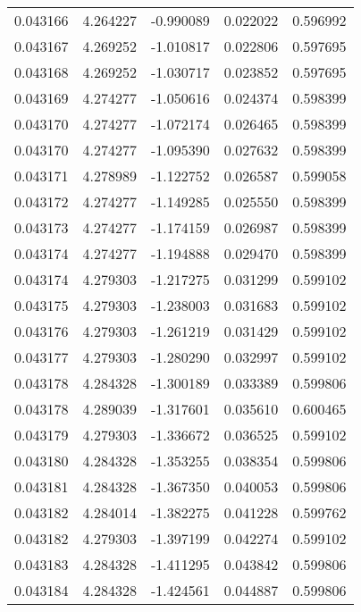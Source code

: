 \begin{tabular}{lrrrr}
0.043166    &  4.264227 & -0.990089 &  0.022022 &             0.596992 \\
0.043167    &  4.269252 & -1.010817 &  0.022806 &             0.597695 \\
0.043168    &  4.269252 & -1.030717 &  0.023852 &             0.597695 \\
0.043169    &  4.274277 & -1.050616 &  0.024374 &             0.598399 \\
0.043170    &  4.274277 & -1.072174 &  0.026465 &             0.598399 \\
0.043170    &  4.274277 & -1.095390 &  0.027632 &             0.598399 \\
0.043171    &  4.278989 & -1.122752 &  0.026587 &             0.599058 \\
0.043172    &  4.274277 & -1.149285 &  0.025550 &             0.598399 \\
0.043173    &  4.274277 & -1.174159 &  0.026987 &             0.598399 \\
0.043174    &  4.274277 & -1.194888 &  0.029470 &             0.598399 \\
0.043174    &  4.279303 & -1.217275 &  0.031299 &             0.599102 \\
0.043175    &  4.279303 & -1.238003 &  0.031683 &             0.599102 \\
0.043176    &  4.279303 & -1.261219 &  0.031429 &             0.599102 \\
0.043177    &  4.279303 & -1.280290 &  0.032997 &             0.599102 \\
0.043178    &  4.284328 & -1.300189 &  0.033389 &             0.599806 \\
0.043178    &  4.289039 & -1.317601 &  0.035610 &             0.600465 \\
0.043179    &  4.279303 & -1.336672 &  0.036525 &             0.599102 \\
0.043180    &  4.284328 & -1.353255 &  0.038354 &             0.599806 \\
0.043181    &  4.284328 & -1.367350 &  0.040053 &             0.599806 \\
0.043182    &  4.284014 & -1.382275 &  0.041228 &             0.599762 \\
0.043182    &  4.279303 & -1.397199 &  0.042274 &             0.599102 \\
0.043183    &  4.284328 & -1.411295 &  0.043842 &             0.599806 \\
0.043184    &  4.284328 & -1.424561 &  0.044887 &             0.599806 \\

\end{tabular}
